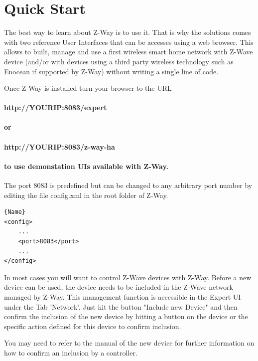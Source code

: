 \section{Quick Start}

The best way to learn about Z-Way is to use it. That is why the solutions comes with two
reference User Interfaces that can be accesses using a web browser. This allows to 
built, manage and use a first wireless smart home network with Z-Wave device (and/or with
devices using a third party wireless technology such as Enocean if supported by Z-Way) 
without writing a single line of code.
 
Once Z-Way is installed turn your browser to the URL

\paragraph{http://YOURIP:8083/expert}

\paragraph{or}

\paragraph{http://YOURIP:8083/z-way-ha} 

 
\paragraph{to use demonstation UIs available with Z-Way.} The port 8083 is predefined but can be 
changed  to any arbitrary port number by editing the file config.xml in the root folder
of Z-Way.

\begin{lstlisting}[caption=part of config.xml]{Name}
<config>
	...
	<port>8083</port>
 	...
</config>
\end{lstlisting}

In most cases you will want to control Z-Wave devices with Z-Way. Before a new device 
can be used, the device needs to be included in the Z-Wave network managed by Z-Way.
This management function is accessible in the Expert UI under the Tab 'Network'. 
Just hit the button "Include new Device" and then confirm the inclusion of the new device 
by hitting a button on the device or the specific action defined for this device to 
confirm inclusion.

You may need to refer to the manual of the new device for further information on how 
to confirm an inclusion by a controller.

